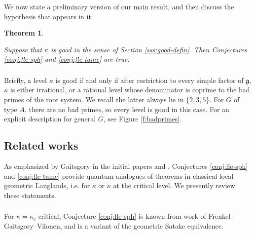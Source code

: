 \documentclass[11pt,reqno]{amsart}
\newcommand{\fg}{\mathfrak{g}}
\newtheorem*{theo*}{Theorem}
\theoremstyle{remark}
\newtheorem{re}[subsubsection]{Remark}
\numberwithin{equation}{section}
\begin{document}
We now state a preliminary version of our main result, and then discuss the 
hypothesis that appears in it. 

\begin{theo*}\label{t:main}

Suppose that $\kappa$ is 
\emph{good} in the sense of Section \ref{sss:good-defin}.
Then Conjectures \ref{conj:fle-sph} and \ref{conj:fle-tame}
are true.

\end{theo*}

\subsubsection{} Briefly, a level $\kappa$ is good if and only if 
after restriction 
to every simple factor of $\fg$, $\kappa$ is 
either irrational, or a rational level 
whose denominator is coprime to the bad primes of the root system. We recall 
the latter always lie in $\{ 2, 3, 5\}$. For 
$G$ of type $A$, there are no bad primes, so every level is good in this
case. For an explicit description for general $G$, see Figure \ref{f:badprimes}.


%
%

\subsection{Related works} As emphasized by Gaitsgory in the initial papers 
\cite{gtw} and  
\cite{quantum-langlands-summary}, 
Conjectures \ref{conj:fle-sph} and 
\ref{conj:fle-tame} provide quantum analogues of theorems in classical local 
geometric 
Langlands, i.e. for $\kappa$ or $\check{\kappa}$ at the critical level. We 
presently review these statements.  

\subsubsection{}

For $\kappa = \kappa_c$ critical, Conjecture \ref{conj:fle-sph} 
is known from work of Frenkel--Gaitsgory--Vilonen, and
is a variant of the geometric Satake equivalence.
\end{document}
